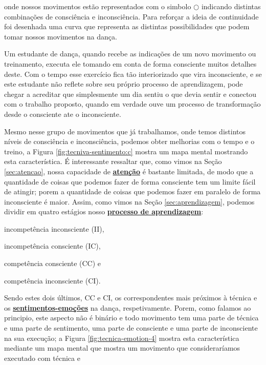 onde nossos movimentos estão representados com o simbolo $\bigcirc$
indicando distintas combinações de consciência e inconsciência.
Para reforçar a ideia de continuidade foi desenhada uma curva que representa as 
distintas possibilidades que podem tomar nossos movimentos na dança.
\begin{example} Um estudante de dança, quando recebe
as indicações de um novo movimento ou treinamento, 
executa ele tomando em conta de forma consciente muitos detalhes deste.
Com o tempo esse exercício fica tão interiorizado que vira inconsciente,
e se este estudante não reflete sobre seu próprio processo de aprendizagem, pode chegar a acreditar 
que simplesmente um dia sentiu o que devia sentir e conectou com o trabalho proposto,
quando em verdade ouve um processo de transformação desde o consciente ate o inconsciente.
\end{example}
Mesmo nesse grupo de movimentos que já trabalhamos, 
onde temos distintos níveis de consciência  e inconsciência,
podemos obter melhorias com o tempo e o treino, a Figura \ref{fig:tecniva-sentimento:c} 
mostra um mapa mental mostrando esta característica.
É interessante ressaltar que, como vimos na Seção \ref{sec:atencao}, 
nossa capacidade de \hyperref[sec:atencao]{\textbf{atenção}} 
é bastante limitada, de modo que a quantidade de coisas que podemos fazer de forma consciente 
tem um limite fácil de atingir; porem a quantidade de coisas que podemos fazer em paralelo de 
forma inconsciente é maior.
Assim, como vimos na Seção \ref{sec:aprendizagem}, 
podemos dividir em quatro estágios nosso \hyperref[sec:aprendizagem]{\textbf{processo de aprendizagem}}:
\begin{inparaitem}
\item incompetência inconsciente (II), \item incompetência consciente (IC), 
\item competência consciente (CC) e \item competência inconsciente (CI).
\end{inparaitem}
Sendo estes dois últimos, CC e CI, 
os correspondentes mais próximos à técnica e os 
\hyperref[ref:emotionsentimental]{\textbf{sentimentos-emoções}} na dança, respetivamente. 
Porem, como falamos ao principio, este aspecto não é binário e todo movimento 
tem uma parte de técnica e uma parte de sentimento, 
uma parte de consciente e uma parte de inconsciente na sua execução;
a Figura \ref{fig:tecnica-emotion-4} mostra esta característica mediante um mapa mental
que mostra um movimento que consideraríamos executado com técnica e 
